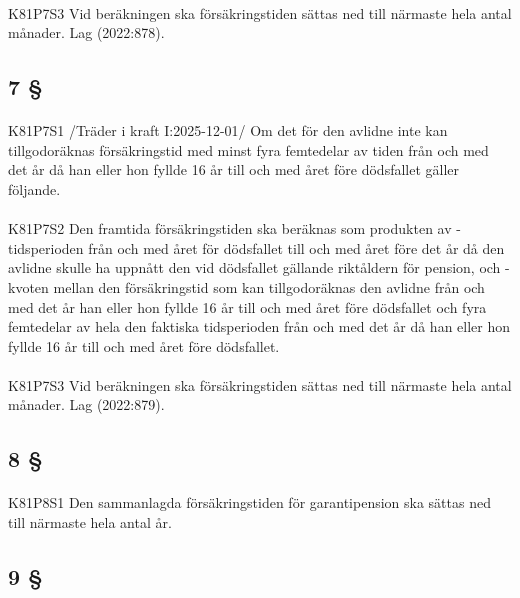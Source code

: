 \documentclass[a4paper,notitlepage,openany,10pt]{book}
\begin{document}
\paragraph*{}
{\tiny K81P7S3}
Vid beräkningen ska försäkringstiden sättas ned till närmaste hela antal månader.
Lag (2022:878).
\subsection*{7 §}
\paragraph*{}
{\tiny K81P7S1}
/Träder i kraft I:2025-12-01/
Om det för den avlidne inte kan tillgodoräknas försäkringstid med minst fyra femtedelar av tiden från och med det år då han eller hon fyllde 16 år till och med året före dödsfallet gäller följande.
\paragraph*{}
{\tiny K81P7S2}
Den framtida försäkringstiden ska beräknas som produkten av
\newline - tidsperioden från och med året för dödsfallet till och med året före det år då den avlidne skulle ha uppnått den vid dödsfallet gällande riktåldern för pension, och
\newline - kvoten mellan den försäkringstid som kan tillgodoräknas den avlidne från och med det år han eller hon fyllde 16 år till och med året före dödsfallet och fyra femtedelar av hela den faktiska tidsperioden från och med det år då han eller hon fyllde 16 år till och med året före dödsfallet.
\paragraph*{}
{\tiny K81P7S3}
Vid beräkningen ska försäkringstiden sättas ned till närmaste hela antal månader.
Lag (2022:879).
\subsection*{8 §}
\paragraph*{}
{\tiny K81P8S1}
Den sammanlagda försäkringstiden för garantipension ska sättas ned till närmaste hela antal år.
\subsection*{9 §}
\end{document}

